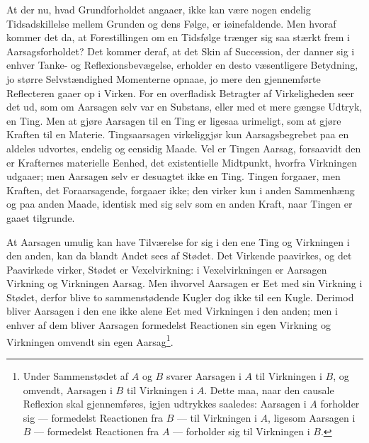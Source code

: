 \documentclass[11pt]{book}
\newcommand{\opage}[1]{\marginnote{\footnotesize\textit{[#1]}}}
\begin{document}
At der nu, hvad
\opage{119} \setcounter{footnote}{0}%
Grundforholdet angaaer, ikke kan være nogen endelig Tidsadskillelse
mellem Grunden og dens Følge, er iøinefaldende. Men hvoraf kommer det da,
at Forestillingen om en Tidsfølge trænger sig saa stærkt frem i
Aarsagsforholdet? Det kommer deraf, at det Skin af Succession, der
danner sig i enhver Tanke- og Reflexionsbevægelse, erholder en desto
væsentligere Betydning, jo større Selvstændighed Momenterne opnaae, jo
mere den gjennemførte Reflecteren gaaer op i Virken. For en overfladisk
Betragter af Virkeligheden seer det ud, som om Aarsagen selv var en
Substans, eller med et
\opage{120} \setcounter{footnote}{0}%
mere gængse Udtryk, en Ting. Men at gjøre Aarsagen til en Ting er
ligesaa urimeligt, som at gjøre Kraften til en Materie. Tingsaarsagen
virkeliggjør kun Aarsagsbegrebet paa en aldeles udvortes, endelig og
eensidig Maade. Vel er Tingen Aarsag, forsaavidt den er Krafternes
materielle Eenhed, det existentielle Midtpunkt, hvorfra Virkningen
udgaaer; men Aarsagen selv er desuagtet ikke en Ting. Tingen forgaaer,
men Kraften, det Foraarsagende, forgaaer ikke; den virker kun i anden
Sammenhæng og paa anden Maade, identisk med sig selv som en anden Kraft,
naar Tingen er gaaet tilgrunde.

At Aarsagen umulig kan have Tilværelse for sig i den ene Ting og
Virkningen i den anden, kan da blandt Andet sees af Stødet. Det Virkende
paavirkes, og det Paavirkede virker, Stødet er Vexelvirkning: i
Vexelvirkningen er Aarsagen Virkning og Virkningen Aarsag. Men ihvorvel
Aarsagen er Eet med sin Virkning i Stødet, derfor blive to sammenstødende
Kugler dog ikke til een Kugle. Derimod bliver Aarsagen i den ene ikke
alene Eet med Virkningen i den anden; men i enhver af dem bliver Aarsagen
formedelst Reactionen sin egen Virkning og Virkningen omvendt sin egen
Aarsag\footnote{Under Sammenstødet af $A$ og $B$ svarer Aarsagen i $A$ til
Virkningen i $B$, og omvendt, Aarsagen i $B$ til Virkningen i $A$. Dette
maa, naar den causale Reflexion skal gjennemføres, igjen udtrykkes
saaledes: Aarsagen i $A$ forholder sig --- formedelst Reactionen fra $B$
--- til Virkningen i $A$, ligesom Aarsagen i $B$ --- formedelst
Reactionen fra $A$ --- forholder sig til Virkningen i $B$.}.
\end{document}
